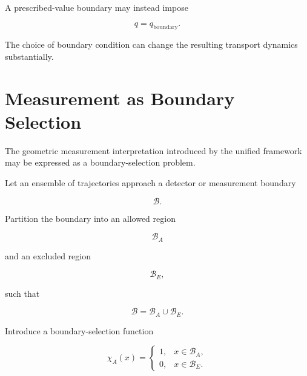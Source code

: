 \documentclass[12pt,oneside]{book}
\begin{document}
A prescribed-value boundary may instead impose

\begin{equation}
    q
    =
    q_{\mathrm{boundary}}.
    \label{eq:dirichlet-boundary}
\end{equation}

The choice of boundary condition can change the resulting
transport dynamics substantially.


\section{Measurement as Boundary Selection}
\label{sec:measurement-boundary-selection}

The geometric measurement interpretation introduced by the
unified framework may be expressed as a boundary-selection
problem.

Let an ensemble of trajectories approach a detector or
measurement boundary

\begin{equation}
    \mathcal{B}.
\end{equation}

Partition the boundary into an allowed region

\begin{equation}
    \mathcal{B}_{A}
\end{equation}

and an excluded region

\begin{equation}
    \mathcal{B}_{E},
\end{equation}

such that

\begin{equation}
    \mathcal{B}
    =
    \mathcal{B}_{A}
    \cup
    \mathcal{B}_{E}.
    \label{eq:measurement-boundary-partition}
\end{equation}

Introduce a boundary-selection function

\begin{equation}
    \chi_A(x)
    =
    \begin{cases}
        1,
        &
        x\in\mathcal{B}_{A},
        \\
        0,
        &
        x\in\mathcal{B}_{E}.
    \end{cases}
    \label{eq:boundary-selection-function}
\end{equation}
\end{document}
